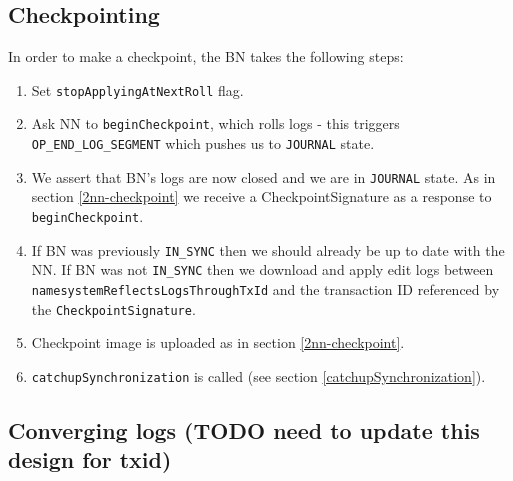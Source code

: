 \documentclass{article}
\begin{document}
\subsection{Checkpointing}

In order to make a checkpoint, the BN takes the following steps:

\begin{enumerate}
\item Set {\tt stopApplyingAtNextRoll} flag.
\item Ask NN to {\tt beginCheckpoint}, which rolls logs - this triggers {\tt OP\_END\_LOG\_SEGMENT} which pushes us to {\tt JOURNAL} state.
\item We assert that BN's logs are now closed and we are in {\tt JOURNAL} state. As in section \ref{2nn-checkpoint} we receive a CheckpointSignature as a response to {\tt beginCheckpoint}.
\item If BN was previously {\tt IN\_SYNC} then we should already be up to date with the NN. If BN was not {\tt IN\_SYNC} then we download and apply edit logs between {\tt namesystemReflectsLogsThroughTxId} and the transaction ID referenced by the {\tt CheckpointSignature}.
\item Checkpoint image is uploaded as in section \ref{2nn-checkpoint}.
\item {\tt catchupSynchronization} is called (see section \ref{catchupSynchronization}).
\end{enumerate}

\subsection{Converging logs (TODO need to update this design for txid)}
\end{document}
